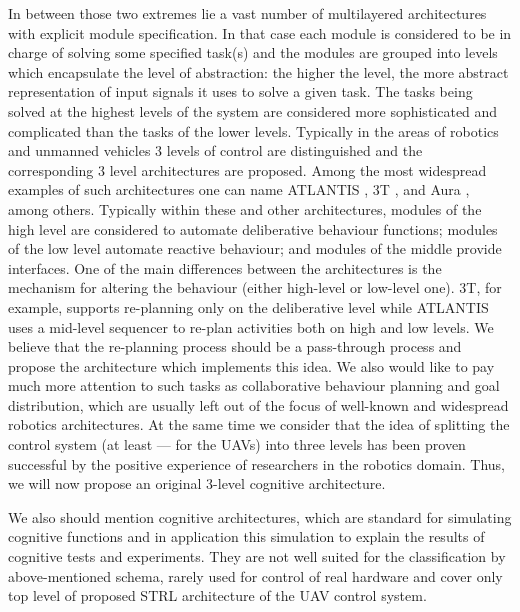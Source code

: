 \documentclass[review]{elsarticle}
\begin{document}
In between those two extremes lie a vast number of multilayered architectures with explicit module specification. In that case each module is considered to be in charge of solving some specified task(s) and the modules are grouped into levels which encapsulate the level of abstraction: the higher the level, the more abstract representation of input signals it uses to solve a given task. The tasks being solved at the highest levels of the system are considered more sophisticated and complicated than the tasks of the lower levels. Typically in the areas of robotics and unmanned vehicles 3 levels of control are distinguished and the corresponding 3 level architectures are proposed. Among the most widespread examples of such architectures one can name ATLANTIS \cite{Gat1992}, 3T \cite{Bonasso1995}, and Aura \cite{Arkin1987}, among others. Typically within these and other architectures, modules of the high level are considered to automate deliberative behaviour functions; modules of the low level automate reactive behaviour; and modules of the middle provide interfaces. One of the main differences between the architectures is the mechanism for altering the behaviour (either high-level or low-level one). 3T, for example, supports re-planning only on the deliberative level while ATLANTIS uses a mid-level sequencer to re-plan activities both on high and low levels. We believe that the re-planning process should be a pass-through process and propose the architecture which implements this idea. We also would like to pay much more attention to such tasks as collaborative behaviour planning and goal distribution, which are usually left out of  the focus of well-known and widespread robotics architectures. At the same time we consider that the idea of splitting the control system (at least --- for the UAVs) into three levels has been proven successful by the positive experience of researchers in the robotics domain. Thus, we will now propose an original 3-level cognitive architecture. 

We also should mention cognitive architectures, which are standard for simulating cognitive functions and in application this simulation to explain the results of cognitive tests and experiments. They are not well suited for the classification by above-mentioned schema, rarely used for control of real hardware and cover only top level of proposed STRL architecture of the UAV control system. 
\end{document}
